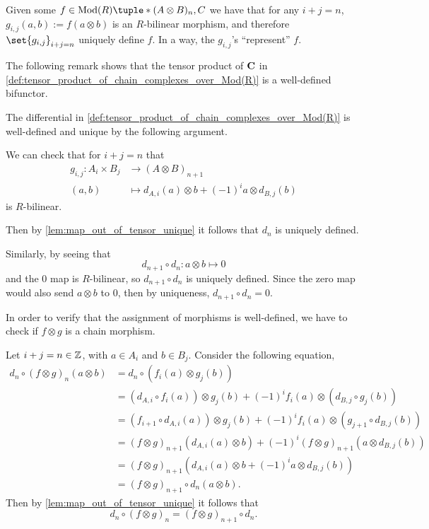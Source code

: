 Given some \( f \in \Mod(R)\tuple*{ (A \otimes B)_n, C } \) we have that for any \( i + j = n \), \( g_{i, j}(a, b) := f(a \otimes b) \) is an \( R \)-bilinear morphism, and therefore \( \set{g_{i, j}}_{i + j = n} \) uniquely define \( f \). In a way, the \( g_{i, j} \)'s ``represent'' \( f \).

The following remark shows that the tensor product of \( \operatorname{\mathbf{C}} \) in \autoref{def:tensor_product_of_chain_complexes_over_Mod(R)} is a well-defined bifunctor.

\begin{remark}
    \label{rem:c_tensor_bifunctor}
    The differential in \autoref{def:tensor_product_of_chain_complexes_over_Mod(R)} is well-defined and unique by the following argument.

    We can check that for \( i + j = n \) that
    \begin{align*}
        g_{i, j}: A_i \times B_j &\to (A \otimes B)_{n + 1} \\
        (a, b) &\mapsto d_{A, i}(a) \otimes b + (-1)^i a \otimes d_{B, j}(b)
    \end{align*}
    is \( R \)-bilinear.

    Then by \autoref{lem:map_out_of_tensor_unique} it follows that \( d_n \) is uniquely defined.

    Similarly, by seeing that
    \[
        d_{n + 1} \circ d_n: a \otimes b \mapsto 0
    \]
    and the \( 0 \) map is \( R \)-bilinear, so \( d_{n + 1} \circ d_n \) is uniquely defined. Since the zero map would also send \( a \otimes b \) to \( 0 \), then by uniqueness, \( d_{n + 1} \circ d_n = 0 \).

    In order to verify that the assignment of morphisms is well-defined, we have to check if \( f \otimes g \) is a chain morphism.
    
    Let \( i + j = n \in {\mathbb{Z}} \), with \( a \in A_i \) and \( b \in B_j \). Consider the following equation,
    \begin{align*}
        d_n \circ (f \otimes g)_n (a \otimes b) &= d_n \circ (f_i(a) \otimes g_j(b)) \\
        &= (d_{A, i} \circ f_i(a)) \otimes g_j(b) + (-1)^i f_i(a) \otimes (d_{B, j} \circ g_j(b)) \\
        &= (f_{i + 1} \circ d_{A, i} (a)) \otimes g_j (b) + (-1)^i f_i(a) \otimes (g_{j + 1} \circ d_{B, j}(b)) \\
        &= (f \otimes g)_{n + 1} (d_{A, i}(a) \otimes b) + (-1)^i (f \otimes g)_{n + 1} (a \otimes d_{B, j}(b)) \\
        &= (f \otimes g)_{n + 1} (d_{A, i} (a) \otimes b + (-1)^i a \otimes d_{B, j} (b)) \\
        &= (f \otimes g)_{n + 1} \circ d_n (a \otimes b).
    \end{align*}
    Then by \autoref{lem:map_out_of_tensor_unique} it follows that
    \[
        d_n \circ (f \otimes g)_n = (f \otimes g)_{n + 1} \circ d_n.
    \]


\end{remark}
